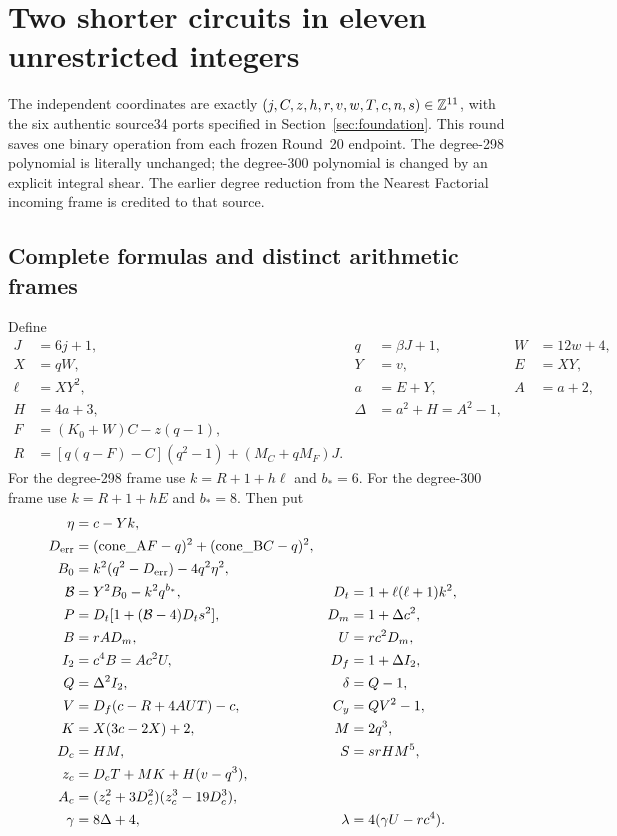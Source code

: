 \section{Two shorter circuits in eleven unrestricted integers}
\label{sec:scalar}
The independent coordinates are exactly
$(j,C,z,h,r,v,w,T,c,n,s)\in\mathbb Z^{11}$, with the six authentic source34
ports specified in Section~\ref{sec:foundation}. This round saves one
binary operation from each frozen Round~20 endpoint. The degree-298
polynomial is literally unchanged; the degree-300 polynomial is changed
by an explicit integral shear. The earlier degree reduction from the
Nearest Factorial incoming frame is credited to that source.

\subsection{Complete formulas and distinct arithmetic frames}
Define
\begin{align*}
 J&=6j+1,&q&=\beta J+1,&W&=12w+4,\\
 X&=qW,&Y&=v,&E&=XY,\\
 \ell&=XY^2,&a&=E+Y,&A&=a+2,\\
 H&=4a+3,&\Delta&=a^2+H=A^2-1,\\
 F&=(K_0+W)C-z(q-1),\\
 R&=[q(q-F)-C](q^2-1)+(M_C+qM_F)J.
\end{align*}
For the degree-298 frame use $k=R+1+h\ell$ and $b_*=6$.
For the degree-300 frame use $k=R+1+hE$ and $b_*=8$.
Then put
\begin{align*}
 \eta&=c-Yk,\\
 D_{\rm err}&=(\mathrm{cone\_A}F-q)^2+(\mathrm{cone\_B}C-q)^2,\\
 B_0&=k^2(q^2-D_{\rm err})-4q^2\eta^2,\\
 \mathcal B&=Y^2B_0-k^2q^{b_*},&D_t&=1+\ell(\ell+1)k^2,\\
 P&=D_t[1+(\mathcal B-4)D_ts^2],&D_m&=1+\Delta c^2,\\
 B&=rAD_m,&U&=rc^2D_m,\\
 I_2&=c^4B=Ac^2U,&D_f&=1+\Delta I_2,\\
 Q&=\Delta^2I_2,&\delta&=Q-1,\\
 V&=D_f(c-R+4AUT)-c,&C_y&=QV^2-1,\\
 K&=X(3c-2X)+2,&M&=2q^3,\\
 D_c&=HM,&S&=srHM^5,\\
 z_c&=D_cT+MK+H(v-q^3),\\
 A_c&=(z_c^2+3D_c^2)(z_c^3-19D_c^3),\\
 \gamma&=8\Delta+4,&\lambda&=4(\gamma U-rc^4).
\end{align*}
